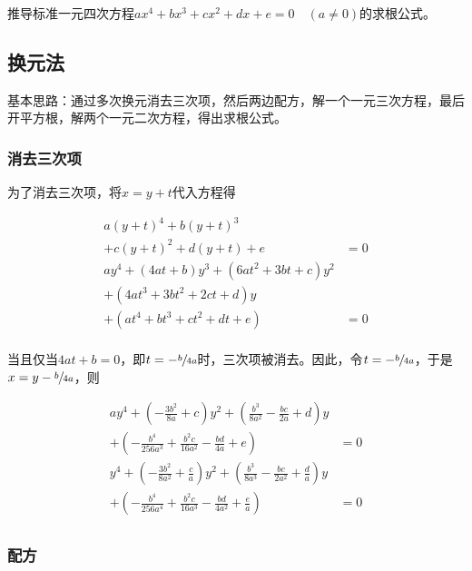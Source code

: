 

推导标准一元四次方程$ax^4 + bx^3 + cx^2 + dx + e = 0\quad(a \ne0)$的求根公式。


\subsection{换元法}

基本思路：通过多次换元消去三次项，然后两边配方，解一个一元三次方程，最后开平方根，解两个一元二次方程，得出求根公式。

\subsubsection{消去三次项}

为了消去三次项，将$x = y + t$代入方程得

\begin{align*}
  a(y + t)^4 + b(y + t)^3 & \\
  + c(y + t)^2 + d(y + t) + e &= 0 \\
  ay^4 + (4at + b)y^3 + (6at^2 + 3bt + c)y^2 & \\
  + (4at^3 + 3bt^2 + 2ct + d)y & \\
  + (at^4 + bt^3 + ct^2 + dt + e) &= 0 \\
\end{align*}

当且仅当$4at + b = 0$，即$t = -\sfrac b{4a}$时，三次项被消去。因此，令$t = -\sfrac b{4a}$，于是$x = y - \sfrac b{4a}$，则

\begin{align*}
  ay^4 + \left(-\frac{3b^2}{8a} + c\right)y^2 + \left(\frac{b^3}{8a^2} - \frac{bc}{2a} + d\right)y & \\
  + \left(-\frac{b^4}{256a^3} + \frac{b^2c}{16a^2} - \frac{bd}{4a} + e\right) &= 0 \\
  y^4 + \left(-\frac{3b^2}{8a^2} + \frac ca\right)y^2 + \left(\frac{b^3}{8a^3} - \frac{bc}{2a^2} + \frac da\right)y & \\
  + \left(-\frac{b^4}{256a^4} + \frac{b^2c}{16a^3} - \frac{bd}{4a^2} + \frac ea\right) &= 0 \\
\end{align*}

\subsubsection{配方}

